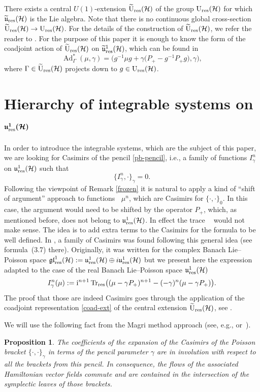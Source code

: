 \documentclass[pdftex]{sigma}
\newtheorem{prop}[thm]{Proposition}
\theoremstyle{definition}
\numberwithin{equation}{section}
\renewcommand{\H}{\mathcal{H}}
\newcommand{\Ur}{\mathrm{U}_{\textnormal{res}}(\H)}
\newcommand{\Urt}{\widetilde{\mathrm{U}}_{\textnormal{res}}(\H)}
\newcommand{\urp}{\mathfrak u_{\textnormal{res}}^1(\H)}
\newcommand{\urt}{\widetilde{\mathfrak u}_{\textnormal{res}}(\H)}
\newcommand{\urtp}{\widetilde{\mathfrak u}_{\textnormal{res}}^1(\H)}
\newcommand{\glrp}{\mathfrak{gl}^1_\textnormal{res}(\H)}
\DeclareMathOperator{\Trr}{Tr_{res}}
\DeclareMathOperator{\Ad}{Ad}
\newcommand{\pb}{\{\cdot,\cdot\}}
\renewcommand{\to}{\rightarrow}
\newcommand{\be}{\begin{equation}}
\newcommand{\ee}{\end{equation}}
\begin{document}
There exists a central $U(1)$-extension $\Urt$ of the group $\Ur$ for which $\urt$ is the Lie algebra. Note that there is no continuous global cross-section $\Urt\to\Ur$. For the details of the construction of $\Urt$, we refer the reader to \cite{mickelsson,segal,wurzbacher}. For the purpose of this paper it is enough to know the form of the coadjoint action of $\Urt$ on $\urtp$, which can be found in \cite{Ratiu-grass,T-siegel,GO-grass}
\be\label{coad-ext}
\Ad^*_{\Gamma}(\mu,\gamma) = \bigl(g^{-1}\mu g + \gamma \bigl(P_+ - g^{-1}P_+ g\bigr), \gamma\bigr),
\ee where $\Gamma\in\Urt$ projects down to $g \in \Ur$.

\section[Hierarchy of integrable systems on u\*1\_res(H)]{Hierarchy of integrable systems on $\boldsymbol{\urp}$}\label{sec:int}

In order to introduce the integrable systems, which are the subject of this paper, we are looking for Casimirs of the pencil \eqref{pb-pencil}, i.e., a family of functions $I_\gamma^n$ on $\urp$ such that
\be\label{casimir}
\{I^n_\gamma,\cdot\}_\gamma = 0.
\ee
Following the viewpoint of Remark \ref{frozen} it is natural to apply a kind of ``shift of argument'' approach to functions $\Trr\mu^n$, which are Casimirs for $\pb_0$. In this case, the argument would need to be shifted by the operator $P_+$, which, as mentioned before, does not belong to $\urp$. In effect the trace $\Trr$ would not make sense. The idea is to add extra terms to the Casimirs for the formula to be well defined. In \cite{GO-grass}, a family of Casimirs was found following this general idea (see formula~(3.7) there). Originally, it was written for the complex Banach Lie--Poisson space $\glrp := \urp \oplus i \urp$ but we present here the expression adapted to the case of the real Banach Lie--Poisson space $\urp$
\be \label{cas}I^n_\gamma(\mu):={\rm i}^{n+1}\Trr\bigl( (\mu-\gamma P_+)^{n+1}-(-\gamma)^{n}(\mu-\gamma P_+)\bigr).\ee
The proof that those are indeed Casimirs goes through the application of the coadjoint representation \eqref{coad-ext} of the central extension $\Urt$, see \cite[equation~(3.2)]{GO-grass}.

We will use the following fact from the Magri method approach (see, e.g., \cite{bols-bor,laurent-gengoux,magri} or~\cite[Appendix~B]{GO-grass}).
\begin{prop}
The coefficients of the expansion of the Casimirs of the Poisson bracket $\pb_\gamma$ in terms of the pencil parameter $\gamma$ are in involution with respect to all the brackets from this pencil. In consequence, the flows of the associated Hamiltonian vector fields commute and are contained in the intersection of the symplectic leaves of those brackets.
\end{prop}
\end{document}
